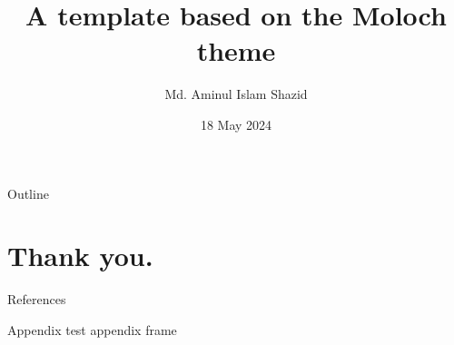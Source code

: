 \documentclass[11pt, aspectratio=169]{beamer}
\title{A template based on the Moloch theme}
\author{Md. Aminul Islam Shazid}
\date{18 May 2024}
\begin{document}
    {
		\addtocounter{framenumber}{-2}    %

		\begin{frame}
			\titlepage
		\end{frame}

		\begin{frame}{Outline}
			\tableofcontents[subsectionstyle=hide]
		\end{frame}
	}

	

    \section*{Thank you.}

    \appendix

    \begingroup
    \renewcommand{\section}[2]{}%
    \begin{frame}[allowframebreaks]{References}
        \def\bibfont{\footnotesize}
            
    \end{frame}
    \endgroup

    \begin{frame}{Appendix}
        test appendix frame
    \end{frame}
\end{document}
